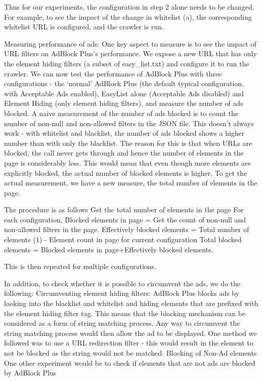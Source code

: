Thus for our experiments, the configuration in step 2 alone needs to be changed. For example, to see the impact of the change in whitelist (a), the corresponding whitelist URL is configured, and the crawler is run. 

Measuring performance of ads:
One key aspect to measure is to see the impact of URL filters on AdBlock Plus's performance. We expose a new URL that has only the element hiding filters (a subset of easy\_list.txt) and configure it to run the crawler. We can now test the performance of AdBlock Plus with three configurations - the ‘normal’ AdBlock Plus (the default typical configuration, with Acceptable Ads enabled), EasyList alone (Acceptable Ads disabled) and Element Hiding (only element hiding filters), and measure the number of ads blocked. 
A naive measurement of the number of ads blocked is to count the number of non-null and non-allowed filters in the JSON file. This doesn’t always work - with whitelist and blacklist, the number of ads blocked shows a higher number than with only the blacklist. The reason for this is that when URLs are blocked, the call never gets through and hence the number of elements in the page is considerably less. This would mean that even though more elements are explicitly blocked, the actual number of blocked elements is higher.
To get the actual measurement, we have a new measure, the total number of elements in the page.

The procedure is as follows
Get the total number of elements in the page
For each configuration,
Blocked elements in page = Get the count of non-null and non-allowed filters in the page.
Effectively blocked elements = Total number of elements (1) - Element count in page for current configuration
Total blocked elements = Blocked elements in page+Effectively blocked elements.

This is then repeated for multiple configurations.

In addition, to check whether it is possible to circumvent the ads, we do the following:
Circumventing element hiding filters:
AdBlock Plus blocks ads by looking into the blacklist and whitelist and hiding elements that are prefixed with the element hiding filter tag. This means that the blocking mechanism can be considered as a form of string matching process. Any way to circumvent the string matching process would then allow the ad to be displayed. One method we followed was to use a URL redirection filter - this would result in the element to not be blocked as the string would not be matched. 
Blocking of Non-Ad elements
One other experiment would be to check if elements that are not ads are blocked by AdBlock Plus






